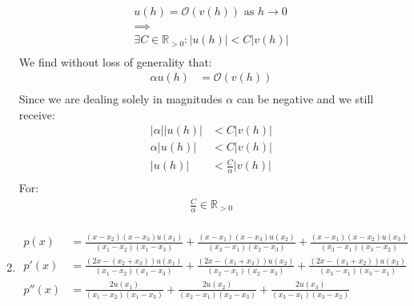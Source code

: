 \documentclass{article}
\begin{document}
\begin{enumerate}
\begin{equation*}
\begin{split}
\displaystyle u(h) =\mathcal{O}(v(h))  \text{ as } h \to 0 \\
\implies \\
\exists C \in \mathbb R_{>0} : \left| u(h) \right| < C\left| v(h) \right| \\
\end{split}
\end{equation*}
We find without loss of generality that:
\begin{equation*}
\begin{split}
\alpha u(h) & = \mathcal{O}(v(h)) \\
\end{split}
\end{equation*}
Since we are dealing solely in magnitudes $\alpha$ can be negative and we still receive:
\begin{equation*}
\begin{split}
\left| \alpha \right| \left| u(h) \right| &< C\left| v(h) \right| \\
\alpha \left| u(h) \right| &< C\left| v(h) \right| \\
 \left| u(h) \right| &< \frac{C}{\alpha} \left| v(h) \right| \\
\end{split}
\end{equation*}
For:
\begin{equation*}
\begin{split}
\frac{C}{\alpha} \in \mathbb R_{>0} \\
\end{split}
\end{equation*}
\item
\begin{equation*}
\begin{split}
p(x) &= \frac{(x-x_{2})(x-x_{3})u(x_{1})}{(x_{1}-x_{2})(x_{1}-x_{3})} +  \frac{(x-x_{1})(x-x_{3})u(x_{2})}{(x_{2}-x_{1})(x_{2}-x_{3})}+ \frac{(x-x_{1})(x-x_{2})u(x_{3})}{(x_{3}-x_{1})(x_{3}-x_{2})}\\
p'(x) &= \frac{(2x-(x_{2}+x_{3}))u(x_{1})}{(x_{1}-x_{2})(x_{1}-x_{3})}+\frac{(2x-(x_{1}+x_{3}))u(x_{2})}{(x_{2}-x_{1})(x_{2}-x_{3})}+\frac{(2x-(x_{1}+x_{2}))u(x_{3})}{(x_{3}-x_{1})(x_{3}-x_{1})} \\
p''(x) & = \frac{2u(x_{1})}{(x_{1}-x_{2})(x_{1}-x_{3})}+\frac{2u(x_{2})}{(x_{2}-x_{1})(x_{2}-x_{3})}+\frac{2u(x_{3})}{(x_{3}-x_{1})(x_{3}-x_{2})}\\
\end{split}

\end{equation*}
\end{enumerate}
\end{document}
